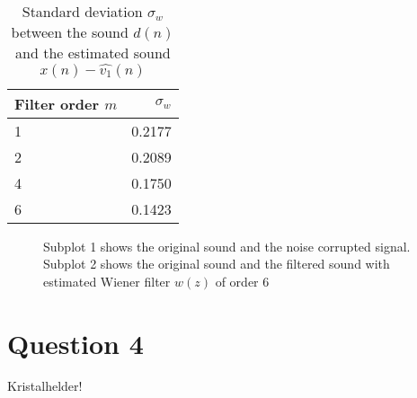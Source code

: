 \documentclass[12pt,a4paper]{article}
\begin{document}
\begin{table}[h!]
\centering
\caption{Standard deviation $\sigma_{w}$ between the sound $d(n)$ and the estimated sound $x(n) - \hat{v_{1}}(n)$}
\begin{tabular}{l | r}
Filter order $m$ & $\sigma_{w}$ \\
\hline
\num{1} & \num{0.2177}\\
\num{2} & \num{0.2089}\\
\num{4} & \num{0.1750}\\
\num{6} & \num{0.1423}\\
\hline
\end{tabular}
\end{table}

\begin{figure}[h!]
\centering

\caption{Subplot 1 shows the original sound and the noise corrupted signal. Subplot 2 shows the original sound and the filtered sound with estimated Wiener filter $w(z)$ of order \num{6}}
\end{figure}

\clearpage\section*{Question 4}
Kristalhelder!
\end{document}
